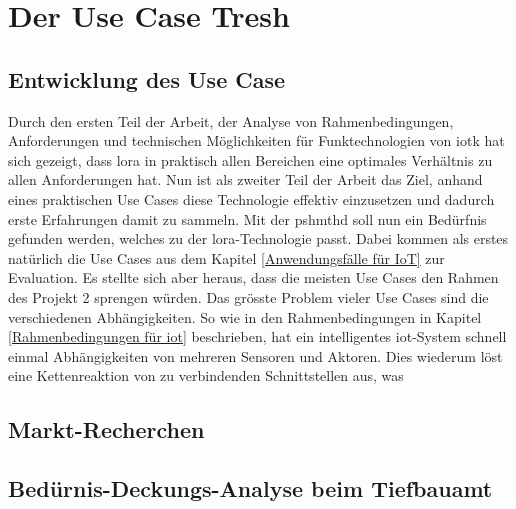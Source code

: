 \chapter{Der Use Case Tresh}
\section{Entwicklung des Use Case}
Durch den ersten Teil der Arbeit, der Analyse von Rahmenbedingungen, Anforderungen und technischen Möglichkeiten für Funktechnologien von \gls{iotk} hat sich gezeigt, dass \gls{lora} in praktisch allen Bereichen eine optimales Verhältnis zu allen Anforderungen hat. Nun ist als zweiter Teil der Arbeit das Ziel, anhand eines praktischen Use Cases diese Technologie effektiv einzusetzen und dadurch erste Erfahrungen damit zu sammeln. Mit der \gls{pshmthd} soll nun ein Bedürfnis gefunden werden, welches zu der \gls{lora}-Technologie passt. Dabei kommen als erstes natürlich die Use Cases aus dem Kapitel \ref{Anwendungsfälle für IoT} zur Evaluation. Es stellte sich aber heraus, dass die meisten Use Cases den Rahmen des Projekt 2 sprengen würden. Das grösste Problem vieler Use Cases sind die verschiedenen Abhängigkeiten. So wie in den Rahmenbedingungen in Kapitel \ref{Rahmenbedingungen für iot} beschrieben, hat ein intelligentes \gls{iot}-System schnell einmal Abhängigkeiten von mehreren Sensoren und Aktoren. Dies wiederum löst eine Kettenreaktion von zu verbindenden Schnittstellen aus, was    

\section{Markt-Recherchen}

\section{Bedürnis-Deckungs-Analyse beim Tiefbauamt}